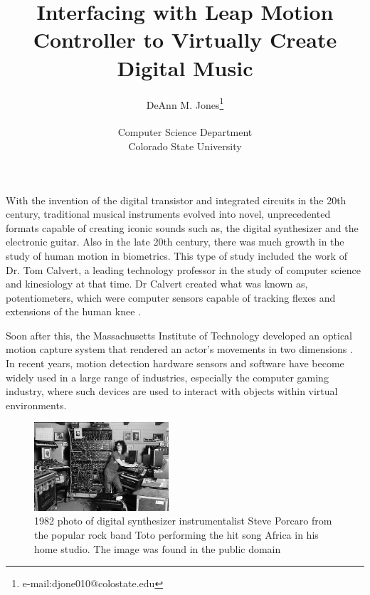 \documentclass{vgtc}                          %
\title{Interfacing with Leap Motion Controller to Virtually Create Digital Music}
\author{DeAnn M. Jones\thanks{e-mail:djone010@colostate.edu}\\ %
     \parbox{1.4in}{\scriptsize \centering Computer Science Department \\ Colorado State University}}
\begin{document}


\maketitle

With the invention of the digital transistor and integrated circuits in the 20th century, traditional musical instruments evolved into novel, unprecedented formats capable of creating iconic sounds such as, the digital synthesizer and the electronic guitar. Also in the late 20th century, there was much growth in the study of human motion in biometrics. This type of study included the work of Dr. Tom Calvert, a leading technology professor in the study of computer science and kinesiology at that time. Dr Calvert created what was known as, potentiometers, which were computer sensors capable of tracking flexes and extensions of the human knee \cite{Calvert:1982:AKS}. 

Soon after this, the Massachusetts Institute of Technology developed an optical motion capture system that rendered an actor’s movements in two dimensions \cite{Maxwell:1984:GM}. In recent years, motion detection hardware sensors and software have become widely used in a large range of industries, especially the computer gaming industry, where such devices are used to interact with objects within virtual environments.

\begin{figure}[h]
\centering
\includegraphics[width=5cm]{pictures/Steve_Porcaro.jpg}
\centering
\caption{1982 photo of digital synthesizer instrumentalist Steve Porcaro from the popular rock band Toto performing the hit song Africa in his home studio. The image was found in the public domain}
\end{figure}
\end{document}
